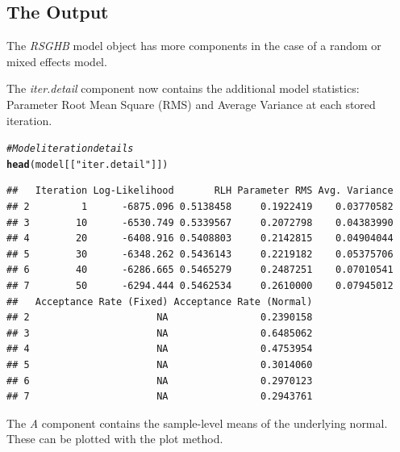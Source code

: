 \documentclass{article}\usepackage[]{graphicx}\usepackage[]{color}
\makeatletter
\newcommand{\hlstr}[1]{\textcolor[rgb]{0.192,0.494,0.8}{#1}}%
\newcommand{\hlcom}[1]{\textcolor[rgb]{0.678,0.584,0.686}{\textit{#1}}}%
\newcommand{\hlstd}[1]{\textcolor[rgb]{0.345,0.345,0.345}{#1}}%
\newcommand{\hlkwd}[1]{\textcolor[rgb]{0.737,0.353,0.396}{\textbf{#1}}}%
\newenvironment{kframe}{%
 \def\at@end@of@kframe{}%
 \ifinner\ifhmode%
  \def\at@end@of@kframe{\end{minipage}}%
  \begin{minipage}{\columnwidth}%
 \fi\fi%
 \def\FrameCommand##1{\hskip\@totalleftmargin \hskip-\fboxsep
 \colorbox{shadecolor}{##1}\hskip-\fboxsep
     \hskip-\linewidth \hskip-\@totalleftmargin \hskip\columnwidth}%
 \MakeFramed {\advance\hsize-\width
   \@totalleftmargin\z@ \linewidth\hsize
   \@setminipage}}%
 {\par\unskip\endMakeFramed%
 \at@end@of@kframe}
\newenvironment{knitrout}{}{} %
\makeatother
\begin{document}
\subsection*{The Output}

The \emph{RSGHB} model object has more components in the case of a random or mixed effects model.

The \emph{iter.detail} component now contains the additional model statistics: Parameter Root Mean Square (RMS) and Average Variance at each stored iteration.

\begin{knitrout}
\color{fgcolor}\begin{kframe}
\begin{alltt}
\hlcom{# Model iteration details}
\hlkwd{head}\hlstd{(model[[}\hlstr{"iter.detail"}\hlstd{]])}
\end{alltt}
\begin{verbatim}
##   Iteration Log-Likelihood       RLH Parameter RMS Avg. Variance
## 2         1      -6875.096 0.5138458     0.1922419    0.03770582
## 3        10      -6530.749 0.5339567     0.2072798    0.04383990
## 4        20      -6408.916 0.5408803     0.2142815    0.04904044
## 5        30      -6348.262 0.5436143     0.2219182    0.05375706
## 6        40      -6286.665 0.5465279     0.2487251    0.07010541
## 7        50      -6294.444 0.5462534     0.2610000    0.07945012
##   Acceptance Rate (Fixed) Acceptance Rate (Normal)
## 2                      NA                0.2390158
## 3                      NA                0.6485062
## 4                      NA                0.4753954
## 5                      NA                0.3014060
## 6                      NA                0.2970123
## 7                      NA                0.2943761
\end{verbatim}
\end{kframe}
\end{knitrout}

The \emph{A} component contains the sample-level means of the underlying normal. These can be plotted with the plot method.
\end{document}
